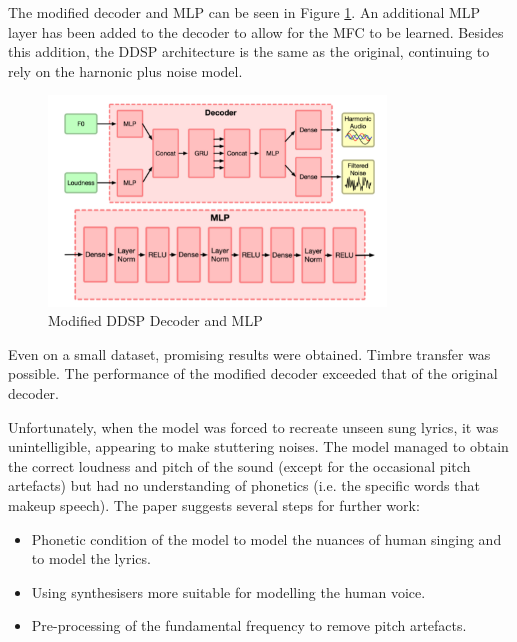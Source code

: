 The modified decoder and MLP can be seen in Figure \ref{fig:singing_decoder_mlp}. An additional MLP layer has been added to the decoder to allow for the MFC to be learned. Besides this addition, the DDSP architecture is the same as the original, continuing to rely on the harnonic plus noise model.

\vspace{0.5cm}
\vspace{0.5cm}

\begin{figure}[H]
    \centering
    \includegraphics[width=0.8\textwidth]{literature_review/SingingDecoderMLP.png}
    \caption{Modified DDSP Decoder and MLP\cite{SingingDDSP}}
    \label{fig:singing_decoder_mlp}
\end{figure}

Even on a small dataset, promising results were obtained. Timbre transfer was possible. The performance of the modified decoder exceeded that of the original decoder.

Unfortunately, when the model was forced to recreate unseen sung lyrics, it was unintelligible, appearing to make stuttering noises. The model managed to obtain the correct loudness and pitch of the sound (except for the occasional pitch artefacts) but had no understanding of phonetics (i.e. the specific words that makeup speech). The paper suggests several steps for further work:

\begin{itemize}
    \item Phonetic condition of the model to model the nuances of human singing and to model the lyrics.
    \item Using synthesisers more suitable for modelling the human voice.
    \item Pre-processing of the fundamental frequency to remove pitch artefacts.
\end{itemize}

